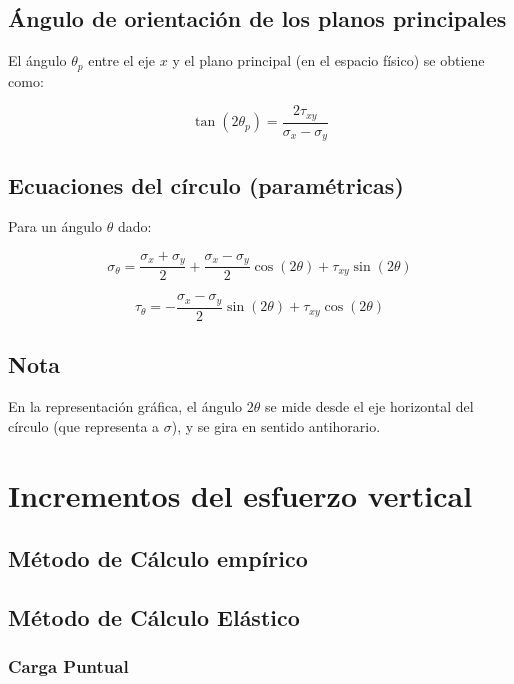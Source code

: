 \documentclass{article} %
\begin{document}
\subsection*{Ángulo de orientación de los planos principales}

El ángulo $\theta_p$ entre el eje $x$ y el plano principal (en el espacio físico) se obtiene como:

\[
\tan(2\theta_p) = \frac{2\tau_{xy}}{\sigma_x - \sigma_y}
\]

\subsection*{Ecuaciones del círculo (paramétricas)}

Para un ángulo $\theta$ dado:

\[
\sigma_\theta = \frac{\sigma_x + \sigma_y}{2} + \frac{\sigma_x - \sigma_y}{2} \cos(2\theta) + \tau_{xy} \sin(2\theta)
\]

\[
\tau_\theta = -\frac{\sigma_x - \sigma_y}{2} \sin(2\theta) + \tau_{xy} \cos(2\theta)
\]

\subsection*{Nota}

En la representación gráfica, el ángulo $2\theta$ se mide desde el eje horizontal del círculo (que representa a $\sigma$), y se gira en sentido antihorario.

\newpage
\section{Incrementos del esfuerzo vertical}

\subsection*{Método de Cálculo empírico}



\subsection*{Método de Cálculo Elástico}
\subsubsection*{Carga Puntual}
\end{document}
